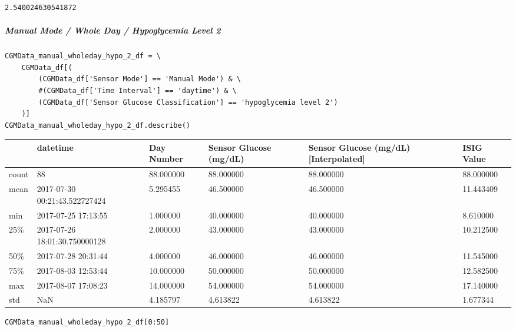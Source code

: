 \begin{verbatim}
2.540024630541872
\end{verbatim}

\subparagraph{Manual Mode / Whole Day / Hypoglycemia Level 2}

\begin{verbatim}
CGMData_manual_wholeday_hypo_2_df = \
    CGMData_df[(
        (CGMData_df['Sensor Mode'] == 'Manual Mode') & \
        #(CGMData_df['Time Interval'] == 'daytime') & \
        (CGMData_df['Sensor Glucose Classification'] == 'hypoglycemia level 2')
    )]
CGMData_manual_wholeday_hypo_2_df.describe()
\end{verbatim}

\bigskip\noindent
\begin{tabular}{p{}p{}p{}p{}p{}p{}}
\toprule
 & datetime & Day Number & Sensor Glucose (mg/dL) & Sensor Glucose (mg/dL) [Interpolated] & ISIG Value \\
\hline
count & 88 & 88.000000 & 88.000000 & 88.000000 & 88.000000 \\
\hline
mean & 2017-07-30 00:21:43.522727424 & 5.295455 & 46.500000 & 46.500000 & 11.443409 \\
\hline
min & 2017-07-25 17:13:55 & 1.000000 & 40.000000 & 40.000000 & 8.610000 \\
\hline
25\% & 2017-07-26 18:01:30.750000128 & 2.000000 & 43.000000 & 43.000000 & 10.212500 \\
\hline
50\% & 2017-07-28 20:31:44 & 4.000000 & 46.000000 & 46.000000 & 11.545000 \\
\hline
75\% & 2017-08-03 12:53:44 & 10.000000 & 50.000000 & 50.000000 & 12.582500 \\
\hline
max & 2017-08-07 17:08:23 & 14.000000 & 54.000000 & 54.000000 & 17.140000 \\
\hline
std & NaN & 4.185797 & 4.613822 & 4.613822 & 1.677344 \\
\hline
\bottomrule
\end{tabular}

\bigskip

\begin{verbatim}
CGMData_manual_wholeday_hypo_2_df[0:50]
\end{verbatim}

